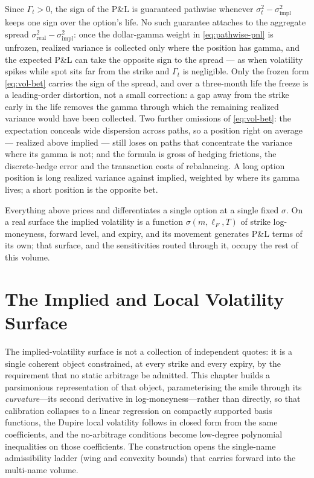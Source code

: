 \documentclass[11pt]{book}
\theoremstyle{plain}
\theoremstyle{definition}
\theoremstyle{remark}
\newcommand{\mln}{m}                             %
\newcommand{\lF}{\ell_F}                         %
\begin{document}
Since $\Gamma_t > 0$, the sign of the P\&L is guaranteed pathwise whenever $\sigma_t^2 - \sigma_{\mathrm{impl}}^2$ keeps one sign over the option's life. No such guarantee attaches to the aggregate spread $\sigma_{\mathrm{real}}^2 - \sigma_{\mathrm{impl}}^2$: once the dollar-gamma weight in \eqref{eq:pathwise-pnl} is unfrozen, realized variance is collected only where the position has gamma, and the expected P\&L can take the opposite sign to the spread --- as when volatility spikes while spot sits far from the strike and $\Gamma_t$ is negligible. Only the frozen form \eqref{eq:vol-bet} carries the sign of the spread, and over a three-month life the freeze is a leading-order distortion, not a small correction: a gap away from the strike early in the life removes the gamma through which the remaining realized variance would have been collected. Two further omissions of \eqref{eq:vol-bet}: the expectation conceals wide dispersion across paths, so a position right on average --- realized above implied --- still loses on paths that concentrate the variance where its gamma is not; and the formula is gross of hedging frictions, the discrete-hedge error and the transaction costs of rebalancing. A long option position is long realized variance against implied, weighted by where its gamma lives; a short position is the opposite bet.

Everything above prices and differentiates a single option at a single fixed $\sigma$. On a real surface the implied volatility is a function $\sigma(\mln, \lF, T)$ of strike log-moneyness, forward level, and expiry, and its movement generates P\&L terms of its own; that surface, and the sensitivities routed through it, occupy the rest of this volume.

\chapter{The Implied and Local Volatility Surface}
\label{ch:surface}

The implied-volatility surface is not a collection of independent quotes: it is
a single coherent object constrained, at every strike and every expiry, by the
requirement that no static arbitrage be admitted. This chapter builds a
parsimonious representation of that object, parameterising the smile through
its \emph{curvature}---its second derivative in log-moneyness---rather than
directly, so that calibration collapses to a linear regression on
compactly supported basis functions, the Dupire local volatility follows in
closed form from the same coefficients, and the no-arbitrage conditions become
low-degree polynomial inequalities on those coefficients. The construction
opens the single-name admissibility ladder (wing and convexity bounds) that
carries forward into the multi-name volume.
\end{document}
